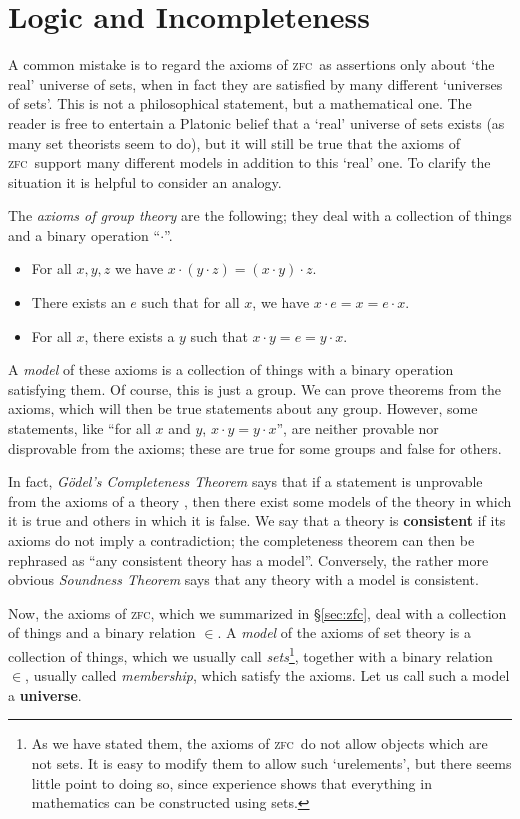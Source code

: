 \documentclass{amsart}
\def\zfc{\textsc{zfc}}
\begin{document}
\section{Logic and Incompleteness}
\label{sec:logic}

A common mistake is to regard the axioms of \zfc\ as assertions only
about `the real' universe of sets, when in fact they are satisfied by
many different `universes of sets'.  This is not a philosophical
statement, but a mathematical one.  The reader is free to entertain a
Platonic belief that a `real' universe of sets exists (as many set
theorists seem to do), but it will still be true that the axioms of
\zfc\ support many different models in addition to this `real' one.  To
clarify the situation it is helpful to consider an analogy.

The \emph{axioms of group theory} are the following; they deal with a
collection of things and a binary operation ``$\cdot$''.
\begin{itemize}
\item For all $x,y,z$ we have $x\cdot (y\cdot z)=(x\cdot y)\cdot z$.
\item There exists an $e$ such that for all $x$, we have $x\cdot e = x
  = e\cdot x$.
\item For all $x$, there exists a $y$ such that $x\cdot y = e = y\cdot
  x$.
\end{itemize}
A \emph{model} of these axioms is a collection of things with a binary
operation satisfying them.  Of course, this is just a group.  We can
prove theorems from the axioms, which will then be true statements
about any group.  However, some statements, like ``for all $x$ and
$y$, $x\cdot y = y\cdot x$'', are neither provable nor disprovable
from the axioms; these are true for some groups and false for others.

In fact, \emph{G\"odel's Completeness Theorem} says that if a
statement is unprovable from the axioms of a theory \cT, then there
exist some models of the theory in which it is true and others in
which it is false.  We say that a theory is \textbf{consistent} if its
axioms do not imply a contradiction; the completeness theorem can then
be rephrased as ``any consistent theory has a model''.  Conversely,
the rather more obvious \emph{Soundness Theorem} says that any theory
with a model is consistent.

Now, the axioms of \zfc, which we summarized in \S\ref{sec:zfc}, deal
with a collection of things and a binary relation $\in$.  A
\emph{model} of the axioms of set theory is a collection of things,
which we usually call \emph{sets}\footnote{As we have stated them, the
  axioms of \zfc\ do not allow objects which are not sets.  It is easy
  to modify them to allow such `urelements', but there seems little
  point to doing so, since experience shows that everything in
  mathematics can be constructed using sets.}, together with a binary
relation $\in$, usually called \emph{membership}, which satisfy the
axioms.  Let us call such a model a \textbf{universe}.
\end{document}
